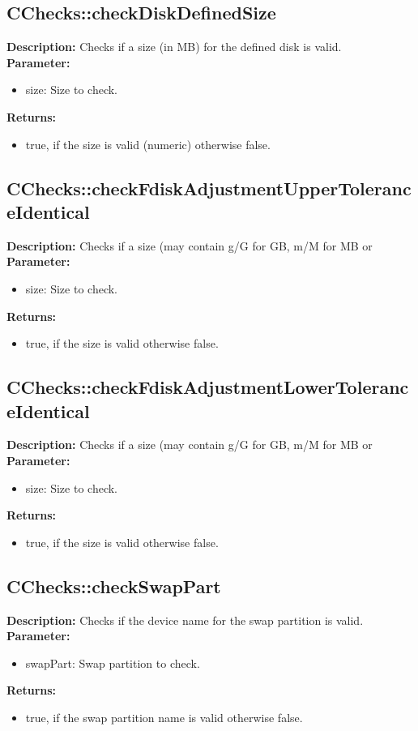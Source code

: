 \subsection{CChecks::checkDiskDefinedSize}
\textbf{Description:} Checks if a size (in MB) for the defined disk is valid.\\
\textbf{Parameter:}
\begin{itemize}
\item size: Size to check.
\end{itemize}
\textbf{Returns:}
\begin{itemize}
\item true, if the size is valid (numeric) otherwise false.
\end{itemize}

\subsection{CChecks::checkFdiskAdjustmentUpperToleranceIdentical}
\textbf{Description:} Checks if a size (may contain g/G for GB, m/M for MB or %
\textbf{Parameter:}
\begin{itemize}
\item size: Size to check.
\end{itemize}
\textbf{Returns:}
\begin{itemize}
\item true, if the size is valid otherwise false.
\end{itemize}

\subsection{CChecks::checkFdiskAdjustmentLowerToleranceIdentical}
\textbf{Description:} Checks if a size (may contain g/G for GB, m/M for MB or %
\textbf{Parameter:}
\begin{itemize}
\item size: Size to check.
\end{itemize}
\textbf{Returns:}
\begin{itemize}
\item true, if the size is valid otherwise false.
\end{itemize}

\subsection{CChecks::checkSwapPart}
\textbf{Description:} Checks if the device name for the swap partition is valid.\\
\textbf{Parameter:}
\begin{itemize}
\item swapPart: Swap partition to check.
\end{itemize}
\textbf{Returns:}
\begin{itemize}
\item true, if the swap partition name is valid otherwise false.
\end{itemize}

